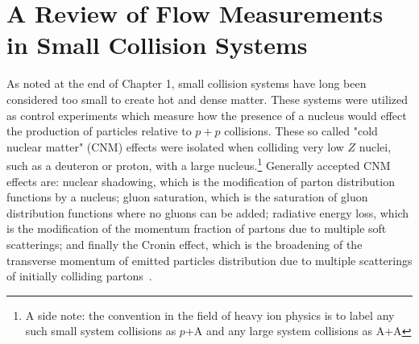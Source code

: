 \section{A Review of Flow Measurements in Small Collision Systems}
As noted at the end of Chapter 1, small collision systems have long been considered too small to create hot and dense matter. These systems were utilized as control experiments which measure how the presence of a nucleus would effect the production of particles relative to $p+p$ collisions. These so called "cold nuclear matter" (CNM) effects were isolated when colliding very low $Z$ nuclei, such as a deuteron or proton, with a large nucleus.\footnote{ A side note: the convention in the field of heavy ion physics is to label any such small system collisions as $p$+A and any large system collisions as A+A} Generally accepted CNM effects are: nuclear shadowing, which is the modification of parton distribution functions by a nucleus; gluon saturation, which is the saturation of gluon distribution functions where no gluons can be added; radiative energy loss, which is the modification of the momentum fraction of partons due to multiple soft scatterings; and finally the Cronin effect, which is the broadening of the transverse momentum of emitted particles distribution due to multiple scatterings of initially colliding partons~\cite{Frawley:2012hv}.

